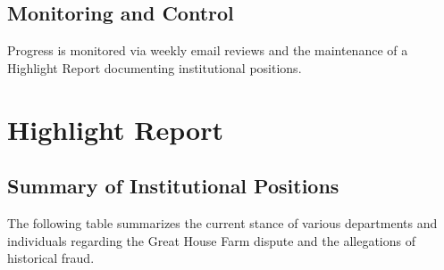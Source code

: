 \documentclass[letterpaper,10pt,openany,oneside,english]{sphinxmanual}
\begin{document}
\section{Monitoring and Control}
\label{\detokenize{plan:monitoring-and-control}}
\sphinxAtStartPar
Progress is monitored via weekly email reviews and the maintenance of a Highlight Report documenting institutional positions.

\sphinxstepscope


\chapter{Highlight Report}
\label{\detokenize{highlight:highlight-report}}\label{\detokenize{highlight::doc}}

\section{Summary of Institutional Positions}
\label{\detokenize{highlight:summary-of-institutional-positions}}
\sphinxAtStartPar
The following table summarizes the current stance of various departments and individuals regarding the Great House Farm dispute and the allegations of historical fraud.
\end{document}
